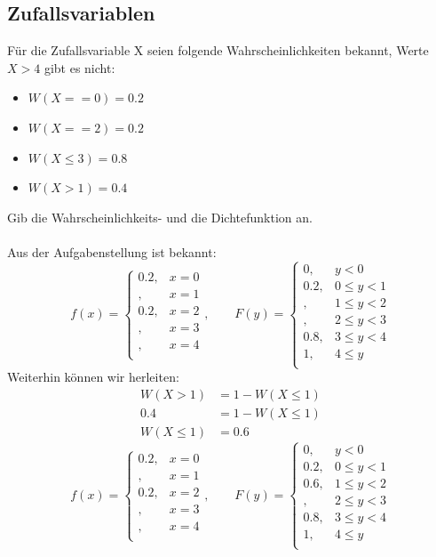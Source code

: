 \documentclass[11pt, a4paper]{article}
\begin{document}
\subsection{Zufallsvariablen}
Für die Zufallsvariable X seien folgende Wahrscheinlichkeiten bekannt, Werte $X > 4$ gibt es nicht:
\begin{itemize}
	\item $W(X == 0) = 0.2$
	\item $W(X == 2) = 0.2$
	\item $W(X \leq 3) = 0.8$
	\item $W(X > 1) = 0.4$
\end{itemize}
Gib die Wahrscheinlichkeits- und die Dichtefunktion an.\\
\\
Aus der Aufgabenstellung ist bekannt:
\[
f(x) = 
\begin{cases}
	0.2, & x = 0 \\
	, & x = 1 \\
	0.2, & x = 2 \\
	, & x = 3 \\
	, & x = 4 \\
\end{cases}, \qquad
F(y) =
\begin{cases}
	0, & y < 0 \\
	0.2, & 0 \leq y < 1 \\
	, & 1 \leq y < 2 \\
	, & 2 \leq y < 3 \\
	0.8, & 3 \leq y < 4 \\
	1, & 4 \leq y \\
\end{cases}
\]
Weiterhin können wir herleiten:
\begin{align*}
	W(X > 1) &= 1 - W(X \leq 1) \\
	0.4 &= 1 - W(X \leq 1) \\
	W(X \leq 1) &= 0.6
\end{align*}
\[
f(x) = 
\begin{cases}
	0.2, & x = 0 \\
	, & x = 1 \\
	0.2, & x = 2 \\
	, & x = 3 \\
	, & x = 4 \\
\end{cases}, \qquad
F(y) =
\begin{cases}
	0, & y < 0 \\
	0.2, & 0 \leq y < 1 \\
	0.6, & 1 \leq y < 2 \\
	, & 2 \leq y < 3 \\
	0.8, & 3 \leq y < 4 \\
	1, & 4 \leq y \\
\end{cases}
\]
\end{document}
